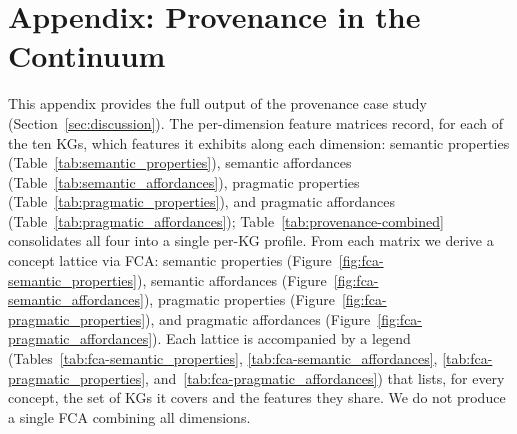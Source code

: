 \documentclass[runningheads]{llncs}
\newenvironment{onlyextended}{\ignorespaces}{\ignorespacesafterend}
\begin{document}
%
%
%


%
\begin{onlyextended}
\clearpage
\section*{Appendix: Provenance in the Continuum}

This appendix provides the full output of the provenance case study
(Section~\ref{sec:discussion}). The per-dimension feature matrices record,
for each of the ten KGs, which features it exhibits along each dimension:
semantic properties (Table~\ref{tab:semantic_properties}), semantic
affordances (Table~\ref{tab:semantic_affordances}), pragmatic properties
(Table~\ref{tab:pragmatic_properties}), and pragmatic affordances
(Table~\ref{tab:pragmatic_affordances}); Table~\ref{tab:provenance-combined}
consolidates all four into a single per-KG profile. From each matrix we
derive a concept lattice via FCA: semantic properties
(Figure~\ref{fig:fca-semantic_properties}), semantic affordances
(Figure~\ref{fig:fca-semantic_affordances}), pragmatic properties
(Figure~\ref{fig:fca-pragmatic_properties}), and pragmatic affordances
(Figure~\ref{fig:fca-pragmatic_affordances}). Each lattice is accompanied by
a legend (Tables~\ref{tab:fca-semantic_properties},
\ref{tab:fca-semantic_affordances}, \ref{tab:fca-pragmatic_properties},
and~\ref{tab:fca-pragmatic_affordances}) that lists, for every concept, the
set of KGs it covers and the features they share.
We do not produce a single FCA combining all dimensions.


\end{onlyextended}
\end{document}
